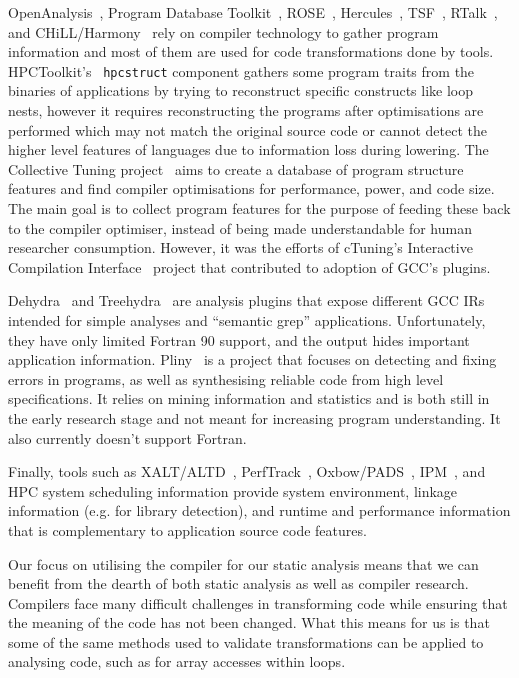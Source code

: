 OpenAnalysis~\cite{Strout:2005}, Program Database Toolkit~\cite{Lindlan2000}, ROSE~\cite{Willcock:2009:RGP:1621607.1621611}, Hercules~\cite{kartsaklis2012hercules}, TSF~\cite{bodin1998user}, RTalk~\cite{SPE:SPE1035}, and CHiLL/Harmony~\cite{tiwari2009scalable} rely on compiler technology to gather program information and most of them are used for code transformations done by tools.
HPCToolkit's~\cite{Adhianto2010} \texttt{hpcstruct} component gathers some program traits from the binaries of applications by trying to reconstruct specific constructs like loop nests, however it requires reconstructing the programs after optimisations are performed which may not match the original source code or cannot detect the higher level features of languages due to information loss during lowering.
The Collective Tuning project~\cite{Fursin:2016} aims to create a database of program structure features and find compiler optimisations for performance, power, and code size.
The main goal is to collect program features for the purpose of feeding these back to the compiler optimiser, instead of being made understandable for human researcher consumption.
However, it was the efforts of cTuning's Interactive Compilation Interface~\cite{ctuning-ici} project that contributed to adoption of \acs{GCC}'s plugins. 

Dehydra~\cite{dehydra} and Treehydra~\cite{treehydra} are analysis plugins that expose different \ac{GCC} \acp{IR} intended for simple analyses and ``semantic grep'' applications.
Unfortunately, they have only limited Fortran 90 support, and the output hides important application information.
Pliny~\cite{Feser:2015} is a project that focuses on detecting and fixing errors in programs, as well as synthesising reliable code from high level specifications.
It relies on mining information and statistics and is both still in the early research stage and not meant for increasing program understanding.
It also currently doesn't support Fortran.

Finally, tools such as XALT/ALTD~\cite{xalt,xalt2}, PerfTrack~\cite{Karavanic:2005:IDT:1105760.1105804}, Oxbow/PADS~\cite{oxbowpads}, IPM~\cite{5695625}, and HPC system scheduling information provide system environment, linkage information (e.g. for library detection), and runtime and performance information that is complementary to application source code features.

Our focus on utilising the compiler for our static analysis means that we can benefit from the dearth of both static analysis as well as compiler research.
Compilers face many difficult challenges in transforming code while ensuring that the meaning of the code has not been changed.
What this means for us is that some of the same methods used to validate transformations can be applied to analysing code, such as for array accesses within loops.

